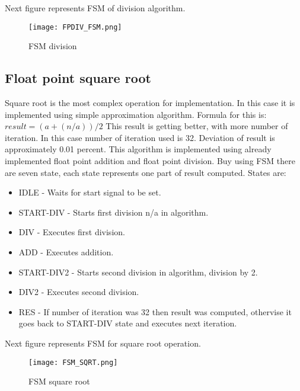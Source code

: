 \documentclass{scrreprt}
\begin{document}
Next figure represents FSM of division algorithm.
\begin{figure}[htb!]
    \centering
    \texttt{[image: FPDIV\_FSM.png]}
    \caption{FSM division}
    \label{fig:FSMd}
\end{figure}
\newline
\newline
\newline
\newline
\newline
\newline
\newline
\newline
\newline
\newline
\newline
\newline
\newline
\newline
{} 
\subsection*{Float point square root}
Square root is the most complex operation for implementation. In this case it is implemented using simple approximation algorithm. Formula for this is: 
\newline
\break
\(result = (a + (n/a))/2\)
\newline
\break
This result is getting better, with more number of iteration. In this case number of iteration used is 32. Deviation of result is approximately 0.01 percent. 
This algorithm is implemented using already implemented float point addition and float point division. Buy using FSM there are seven state, each state represents one part of result computed. States are:
\begin{itemize}
    \item  IDLE - Waits for start signal to be set.
    \item  START-DIV - Starts first division n/a in algorithm. 
    \item  DIV - Executes first division.
    \item  ADD - Executes addition.
    \item  START-DIV2 - Starts second division in algorithm, division by 2.
    \item  DIV2 - Executes second division.
    \item  RES - If number of iteration was 32 then result was computed, othervise it goes back to START-DIV state and executes next iteration.
\end{itemize}
Next figure represents FSM for square root operation. 
\begin{figure}[htb!]
    \centering
    \texttt{[image: FSM\_SQRT.png]}
    \caption{FSM square root}
    \label{fig:FSMsq}
\end{figure}
\end{document}
